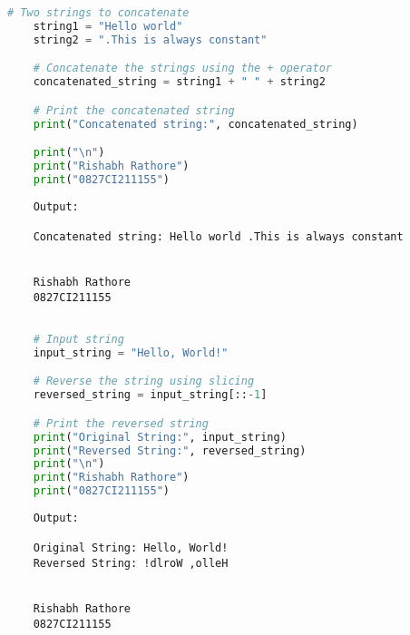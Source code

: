 \documentclass{report}
\begin{document}
\sol{}
\begin{lstlisting}[language=Python]
	# Two strings to concatenate
	string1 = "Hello world"
	string2 = ".This is always constant"

	# Concatenate the strings using the + operator
	concatenated_string = string1 + " " + string2

	# Print the concatenated string
	print("Concatenated string:", concatenated_string)

	print("\n")
	print("Rishabh Rathore")
	print("0827CI211155")
\end{lstlisting}

\begin{verbatim}
	Output:

	Concatenated string: Hello world .This is always constant


	Rishabh Rathore
	0827CI211155
\end{verbatim}
\bigskip


\sol{}
\begin{lstlisting}[language=Python]

	# Input string
	input_string = "Hello, World!"

	# Reverse the string using slicing
	reversed_string = input_string[::-1]

	# Print the reversed string
	print("Original String:", input_string)
	print("Reversed String:", reversed_string)
	print("\n")
	print("Rishabh Rathore")
	print("0827CI211155")
\end{lstlisting}

\begin{verbatim}
	Output:

	Original String: Hello, World!
	Reversed String: !dlroW ,olleH
	
	
	Rishabh Rathore
	0827CI211155
\end{verbatim}
\bigskip
\end{document}
